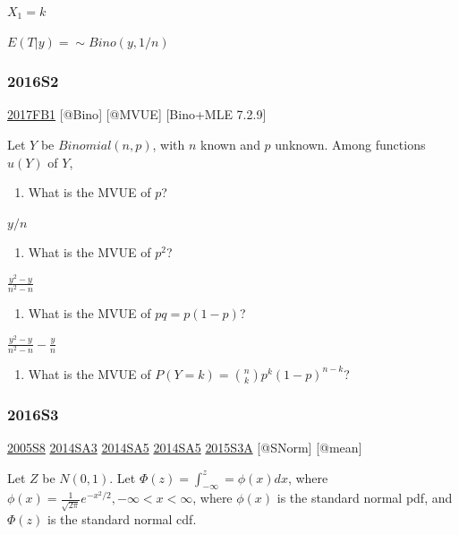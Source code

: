 \documentclass[6pt,Portrait]{article}
\providecommand{\tightlist}{%
  \setlength{\itemsep}{0pt}\setlength{\parskip}{0pt}}
\begin{document}
\(X_1=k\)

\(E(T|y)= \sim Bino(y,1/n)\)

\hypertarget{s2-4}{%
\subsubsection{2016S2}\label{s2-4}}

\protect\hyperlink{fb1-3}{2017FB1} {[}@Bino{]} {[}@MVUE{]} {[}Bino+MLE
7.2.9{]}

Let \(Y\) be \(Binomial(n,p)\), with \(n\) known and \(p\) unknown.
Among functions \(u(Y)\) of \(Y\),

\begin{enumerate}
\def\labelenumi{(\alph{enumi})}
\tightlist
\item
  What is the MVUE of \(p\)?
\end{enumerate}

\(y/n\)

\begin{enumerate}
\def\labelenumi{(\alph{enumi})}
\setcounter{enumi}{1}
\tightlist
\item
  What is the MVUE of \(p^2\)?
\end{enumerate}

\(\frac{y^2-y}{n^2-n}\)

\begin{enumerate}
\def\labelenumi{(\alph{enumi})}
\setcounter{enumi}{2}
\tightlist
\item
  What is the MVUE of \(pq=p(1-p)\)?
\end{enumerate}

\(\frac{y^2-y}{n^2-n}-\frac{y}n\)

\begin{enumerate}
\def\labelenumi{(\alph{enumi})}
\setcounter{enumi}{3}
\tightlist
\item
  { What is the MVUE of \(P(Y=k)=\binom{n}{k}p^k(1-p)^{n-k}\)?}
\end{enumerate}

\hypertarget{s3-4}{%
\subsubsection{2016S3}\label{s3-4}}

\protect\hyperlink{s8-1}{2005S8} \protect\hyperlink{sa3-2}{2014SA3}
\protect\hyperlink{sa5-1}{2014SA5} \protect\hyperlink{sa5-1}{2014SA5}
\protect\hyperlink{s3a-1}{2015S3A} {[}@SNorm{]} {[}@mean{]}

Let \(Z\) be \(N(0,1)\). Let \(\Phi(z)=\int_{-\infty}^z=\phi(x)dx\),
where \(\phi(x) = \frac1{\sqrt{2\pi}}e^{-x^2/2},-\infty<x<\infty\),
where \(\phi(x)\) is the standard normal pdf, and \(\Phi(z)\) is the
standard normal cdf.
\end{document}
